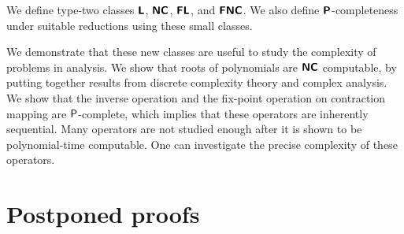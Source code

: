 \documentclass[envcountsame,orivec,oribibl]{llncs}
\begin{document}
We define type-two classes $\text{\bfseries \sffamily \upshape L}$, $\text{\bfseries \sffamily \upshape NC}$, $\text{\bfseries \sffamily \upshape FL}$,
and $\text{\bfseries \sffamily \upshape FNC}$.
We also define $\text{\bfseries \sffamily \upshape P}$-completeness 
under suitable reductions using these small classes.


We demonstrate that these new classes are useful to study the complexity 
of problems in analysis.
We show that roots of polynomials are $\text{\bfseries \sffamily \upshape NC}$ computable,
by putting together results from discrete complexity theory and
 complex analysis.
We show that the inverse operation and the fix-point operation on contraction mapping are $\mathsf{P}$-complete, which implies that these operators are inherently sequential.
Many operators are not studied enough after it is shown to be polynomial-time
computable.
One can investigate the precise complexity of these operators.




\clearpage
\appendix
\section{Postponed proofs}
\end{document}
